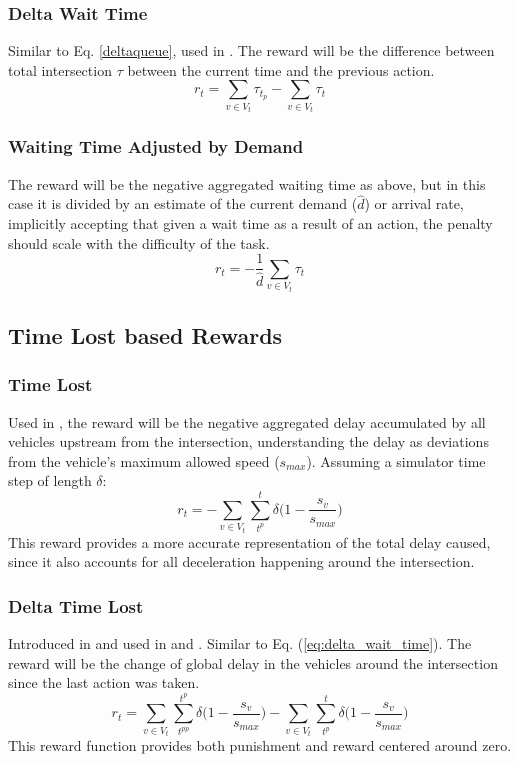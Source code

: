 \documentclass[conference]{IEEEtran}
\begin{document}
\subsubsection{Delta Wait Time}
Similar to Eq. \ref{deltaqueue}, used in \cite{liang2018}. The reward will be the difference between total intersection $\tau$ between the current time and the previous action. 
\begin{equation}
r_t =  \sum_{v \in V_t} \tau_{t_p} -  \sum_{v \in V_t} \tau_{t}
\label{eq:delta_wait_time}
\end{equation}

\subsubsection{Waiting Time Adjusted by Demand}
The reward will be the negative aggregated waiting time as above, but in this case it is divided by an estimate of the current demand ($\hat{d}$) or arrival rate, implicitly accepting that given a wait time as a result of an action, the penalty should scale with the difficulty of the task.
\begin{equation}
   r_t = -\frac{1}{\hat{d}} \sum_{v \in V_t} \tau_{t}
\label{eq:wait_time_norm} 
\end{equation}

\subsection{Time Lost based Rewards}
\subsubsection{Time Lost}
Used in \cite{wan2018}, the reward will be the negative aggregated delay accumulated by all vehicles upstream from the intersection, understanding the delay as deviations from the vehicle's maximum allowed speed ($s_{max}$). 
Assuming a simulator time step of length $\delta$:
\begin{equation}
    r_t = - \sum_{v \in V_t}  \sum_{t^p}^t \delta \big( 1-\frac{s_v}{s_{max}} \big)
\label{eq:delay}
\end{equation}
This reward provides a more accurate representation of the total delay caused, since it also accounts for all deceleration happening around the intersection. 

\subsubsection{Delta Time Lost}
Introduced in \cite{abdulhai2010} and used in \cite{mannion} \cite{genders2016} \cite{gao2017} \cite{mousavi2017} and \cite{genders2018}.
Similar to Eq. (\ref{eq:delta_wait_time}).
The reward will be the change of global delay in the vehicles around the intersection since the last action was taken.
\begin{equation}
   r_t = \sum_{v \in V_t}  \sum_{t^{pp}}^{t^p} \delta  \big( 1-\frac{s_v}{s_{max}} \big) - \sum_{v \in V_t}  \sum_{t^p}^t \delta  \big( 1-\frac{s_v}{s_{max}} \big)
\label{eq:changedelay} 
\end{equation}
This reward function provides both punishment and reward centered around zero.
\end{document}
